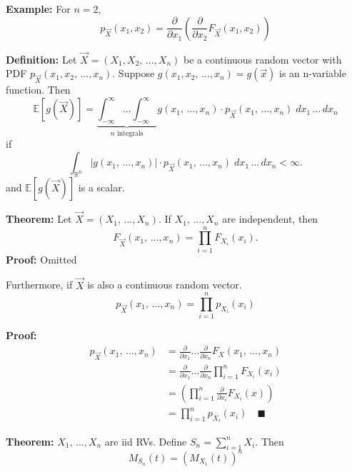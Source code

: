 \documentclass[12pt]{article}
\newcommand{\R}{\mathbb{R}}
\newcommand{\qed}{\quad \blacksquare}
\newcommand{\E}{\mathbb{E}}
\begin{document}
\textbf{Example:} 
For $n = 2$, 
\[p_{\vec{X}}(x_1, x_2) = \frac{\partial}{\partial x_1}\left(\frac{\partial}{\partial x_2} F_{\vec{X}}(x_1, x_2)\right)\]

\textbf{Definition:} Let $\vec{X} = (X_1, X_2, \, ..., X_n)$ be a continuous random vector with PDF $p_{\vec{X}}(x_1, x_2, \, ..., x_n)$. Suppose $g(x_1, x_2, \, ..., x_n) = g(\vec{x})$ is an n-variable function. Then
\[\E[g(\vec{X})] = \underbrace{\int_{-\infty}^{\infty} ... \int_{-\infty}^{\infty}}_{n \text{ integrals}} g(x_1, \, ..., x_n) \cdot p_{\vec{X}}(x_1, \, ..., x_n)\; dx_1 \, ...\, dx_n\]
if 
\[\int_{\R^n} |g(x_1, \, ..., x_n)| \cdot p_{\vec{X}}(x_1, \, ..., x_n)\; dx_1 \, ...\, dx_n < \infty.\]
and $\E[g(\vec{X})]$ is a scalar. 

\textbf{Theorem:} Let $\vec{X} = (X_1, \, ..., X_n)$. If $X_1, \, ..., X_n$ are independent, then 
\[F_{\vec{X}}(x_1, \, ..., x_n) = \prod_{i=1}^n F_{X_i}(x_i).\]
\textbf{Proof:} Omitted

Furthermore, if $\vec{X}$ is also a continuous random vector. 
\[p_{\vec{X}}(x_1, \, ..., x_n) = \prod_{i=1}^n p_{X_i}(x_i)\]

\textbf{Proof:} 
\begin{align*}
    p_{\vec{X}}(x_1, \, ..., x_n) &= \frac{\partial}{\partial x_1} ...\frac{\partial}{\partial x_n} F_X(x_1,\, ..., x_n)\\
    &= \frac{\partial}{\partial x_1} ...\frac{\partial}{\partial x_n}\prod_{i=1}^n F_{X_i}(x_i)\\
    &= \left(\prod_{i=1}^n \frac{\partial}{\partial x_i} F_{X_i}(x)\right)\\
    &= \prod_{i=1}^n p_{X_i}(x_i) \qed
\end{align*}

\textbf{Theorem:} $X_1, \, ..., X_n$ are iid RVs. Define $S_n = \sum_{i=1}^n X_i$. Then
\[M_{S_n}(t) = \left(M_{X_1}(t)\right)^n\]
\end{document}
